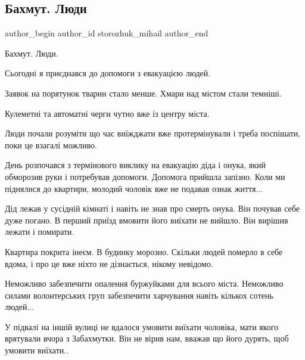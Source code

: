  
 
 
 
 

\subsection{Бахмут. Люди}
\label{sec:13_01_2023.fb.storozhuk_mihail.1.bakhmut__lyudi}

\ifcmt
 author_begin
   author_id storozhuk_mihail
 author_end
\fi

Бахмут. Люди.

Сьогодні я приєднався до допомоги з евакуацією людей. 

Заявок на порятунок тварин стало менше. Хмари над містом стали темніші. 

Кулеметні та автоматні черги чутно вже із центру міста. 

Люди почали розуміти що час виїжджати вже протермінували і треба поспішати,
поки це взагалі можливо.

День розпочався з термінового виклику на евакуацію діда і онука, який обморозив
руки і потребував допомоги. Допомога прийшла запізно. Коли ми піднялися до
квартири, молодий чоловік вже не подавав ознак життя...

Дід лежав у сусідній кімнаті і навіть не знав про смерть онука. Він почував
себе дуже погано. В перший приїзд вмовити його виїхати не вийшло. Він вирішив
лежати і помирати.

Квартира покрита інеєм. В будинку морозно. Скільки людей померло в себе вдома,
і про це вже ніхто не дізнається,  нікому невідомо.

Неможливо забезпечити опалення буржуйками для всього міста. Неможливо силами
волонтерських груп забезпечити харчування навіть кількох сотень людей...

У підвалі на іншій вулиці не вдалося умовити виїхати чоловіка, мати якого
врятували вчора з Забахмутки. Він не вірив нам, вважав що його дурять, щоб
умовити виїхати..

